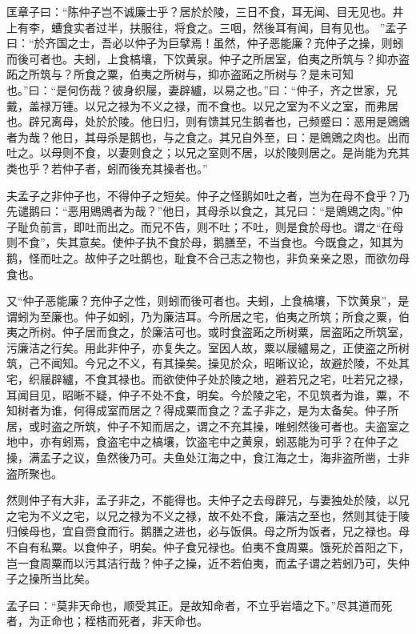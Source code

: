 \documentclass[]{article}
\begin{document}
匡章子曰：``陈仲子岂不诚廉士乎？居於於陵，三日不食，耳无闻、目无见也。井上有李，螬食实者过半，扶服往，将食之。三咽，然後耳有闻，目有见也。
''孟子曰：``於齐国之士，吾必以仲子为巨擘焉！虽然，仲子恶能廉？充仲子之操，则蚓而後可者也。夫蚓，上食槁壤，下饮黄泉。仲子之所居室，伯夷之所筑与？抑亦盗跖之所筑与？所食之粟，伯夷之所树与，抑亦盗跖之所树与？是未可知也。''曰：``是何伤哉？彼身织屦，妻辟纑，以易之也。''曰：``仲子，齐之世家，兄戴，盖禄万锺。以兄之禄为不义之禄，而不食也。以兄之室为不义之室，而弗居也。辟兄离母，处於於陵。他日归，则有馈其兄生鹅者也，己频蹙曰：恶用是鶂鶂者为哉？他日，其母杀是鹅也，与之食之。其兄自外至，曰：是鶂鶂之肉也。出而吐之。以母则不食，以妻则食之；以兄之室则不居，以於陵则居之。是尚能为充其类也乎？若仲子者，蚓而後充其操者也。''

夫孟子之非仲子也，不得仲子之短矣。仲子之怪鹅如吐之者，岂为在母不食乎？乃先谴鹅曰：``恶用鶂鶂者为哉？''他日，其母杀以食之，其兄曰：``是鶂鶂之肉。''仲子耻负前言，即吐而出之。而兄不告，则不吐；不吐，则是食於母也。谓之``在母则不食''，失其意矣。使仲子执不食於母，鹅膳至，不当食也。今既食之，知其为鹅，怪而吐之。故仲子之吐鹅也，耻食不合己志之物也，非负亲亲之恩，而欲勿母食也。

又``仲子恶能廉？充仲子之性，则蚓而後可者也。夫蚓，上食槁壤，下饮黄泉''，是谓蚓为至廉也。仲子如蚓，乃为廉洁耳。今所居之宅，伯夷之所筑；所食之粟，伯夷之所树。仲子居而食之，於廉洁可也。或时食盗跖之所树粟，居盗跖之所筑室，污廉洁之行矣。用此非仲子，亦复失之。室因人故，粟以屦纑易之，正使盗之所树筑，己不闻知。今兄之不义，有其操矣。操见於众，昭晰议论，故避於陵，不处其宅，织屦辟纑，不食其禄也。而欲使仲子处於陵之地，避若兄之宅，吐若兄之禄，耳闻目见，昭晰不疑，仲子不处不食，明矣。今於陵之宅，不见筑者为谁，粟，不知树者为谁，何得成室而居之？得成粟而食之？孟子非之，是为太备矣。仲子所居，或时盗之所筑，仲子不知而居之，谓之不充其操，唯蚓然後可者也。夫盗室之地中，亦有蚓焉，食盗宅中之槁壤，饮盗宅中之黄泉，蚓恶能为可乎？在仲子之操，满孟子之议，鱼然後乃可。夫鱼处江海之中，食江海之士，海非盗所凿，士非盗所聚也。

然则仲子有大非，孟子非之，不能得也。夫仲子之去母辟兄，与妻独处於陵，以兄之宅为不义之宅，以兄之禄为不义之禄，故不处不食，廉洁之至也，然则其徒于陵归候母也，宜自赍食而行。鹅膳之进也，必与饭俱。母之所为饭者，兄之禄也。母不自有私粟。以食仲子，明矣。仲子食兄禄也。伯夷不食周粟。饿死於首阳之下，岂一食周粟而以污其洁行哉？仲子之操，近不若伯夷，而孟子谓之若蚓乃可，失仲子之操所当比矣。

孟子曰：``莫非天命也，顺受其正。是故知命者，不立乎岩墙之下。''尽其道而死者，为正命也；桎梏而死者，非天命也。
\end{document}
